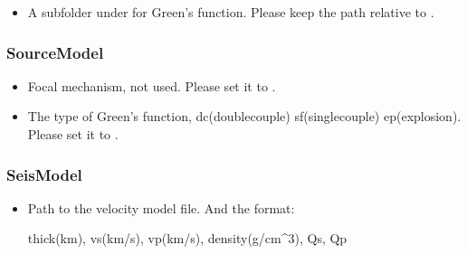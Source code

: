 \documentclass[a4paper,10pt,english,openany]{sphinxmanual}
\begin{document}
\begin{itemize}
\item {} 
A subfolder under  for Green’s function. Please keep the path relative to .

\end{itemize}


\subsubsection{SourceModel}
\label{\detokenize{tutorials/S1_Build_GFs:sourcemodel}}
\begin{itemize}
\item {} 
Focal mechanism, not used. Please set it to .

\end{itemize}

\begin{itemize}
\item {} 
The type of Green’s function, dc(double\sphinxhyphen{}couple) sf(single\sphinxhyphen{}couple) ep(explosion). Please set it to .

\end{itemize}


\subsubsection{SeisModel}
\label{\detokenize{tutorials/S1_Build_GFs:seismodel}}
\begin{itemize}
\item {} 
Path to the velocity model file. And the format:

thick(km), vs(km/s), vp(km/s), density(g/cm\textasciicircum{}3), Qs, Qp

\end{itemize}
\end{document}
